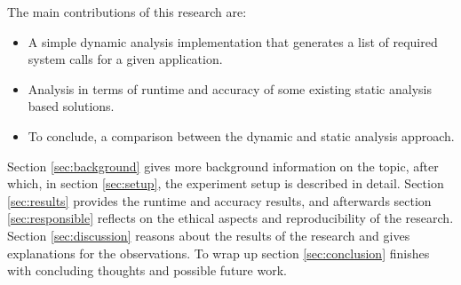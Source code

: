 The main contributions of this research are:
\begin{itemize}
    \item{A simple dynamic analysis implementation that generates a list of required system calls for a given application.}
    \item{Analysis in terms of runtime and accuracy of some existing static analysis based solutions.}
    \item{To conclude, a comparison between the dynamic and static analysis approach.}
\end{itemize}

Section \ref{sec:background} gives more background information on the topic, after which, in section \ref{sec:setup}, the experiment setup is described in detail.
Section \ref{sec:results} provides the runtime and accuracy results, and afterwards section \ref{sec:responsible} reflects on the ethical aspects and reproducibility of the research.
Section \ref{sec:discussion} reasons about the results of the research and gives explanations for the observations.
To wrap up section \ref{sec:conclusion} finishes with concluding thoughts and possible future work.
